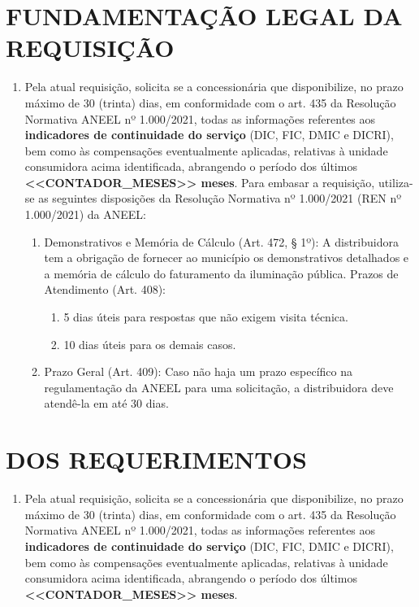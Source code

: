 \newcommand{\tipoRequerimento}{Solicitação de informação sobre os Indicadores de Continuidade}

\section{FUNDAMENTAÇÃO LEGAL DA REQUISIÇÃO}

\begin{enumerate}[resume]
\item Pela atual requisição, solicita se a concessionária que disponibilize, no prazo máximo de 30 (trinta) dias, em conformidade com o art. 435 da Resolução Normativa ANEEL nº 1.000/2021, todas as informações referentes aos \textbf{indicadores de continuidade do serviço} (DIC, FIC, DMIC e DICRI), bem como às compensações eventualmente aplicadas, relativas à unidade consumidora acima identificada, abrangendo o período dos últimos \textbf{<<CONTADOR_MESES>> meses}.
  Para embasar a requisição, utiliza-se as seguintes disposições da Resolução Normativa nº 1.000/2021 (REN nº 1.000/2021) da ANEEL:
  \begin{enumerate}
  \item
    Demonstrativos e Memória de Cálculo (Art. 472, § 1º): A distribuidora tem a obrigação de fornecer ao município os demonstrativos detalhados e a memória de cálculo do faturamento da iluminação pública. Prazos de Atendimento (Art. 408):
    \begin{enumerate}
      \item  
      5 dias úteis para respostas que não exigem visita técnica.
      \item 
      10 dias úteis para os demais casos.
    \end{enumerate}
  \item 
  Prazo Geral (Art. 409): Caso não haja um prazo específico na regulamentação da ANEEL para uma solicitação, a distribuidora deve atendê-la em até 30 dias.
  \end{enumerate}
\end{enumerate}

\section{DOS REQUERIMENTOS}

\begin{enumerate}[resume]
\item Pela atual requisição, solicita se a concessionária que disponibilize, no prazo máximo de 30 (trinta) dias, em conformidade com o art. 435 da Resolução Normativa ANEEL nº 1.000/2021, todas as informações referentes aos \textbf{indicadores de continuidade do serviço} (DIC, FIC, DMIC e DICRI), bem como às compensações eventualmente aplicadas, relativas à unidade consumidora acima identificada, abrangendo o período dos últimos \textbf{<<CONTADOR_MESES>> meses}.
\end{enumerate}

